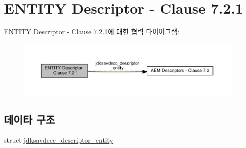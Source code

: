 \hypertarget{group__descriptor__entity}{}\section{E\+N\+T\+I\+TY Descriptor -\/ Clause 7.2.1}
\label{group__descriptor__entity}
E\+N\+T\+I\+TY Descriptor -\/ Clause 7.2.1에 대한 협력 다이어그램\+:
\nopagebreak
\begin{figure}[H]
\begin{center}
\leavevmode
\includegraphics[width=350pt]{group__descriptor__entity}
\end{center}
\end{figure}
\subsection*{데이타 구조}
\begin{DoxyCompactItemize}
\item 
struct \hyperlink{structjdksavdecc__descriptor__entity}{jdksavdecc\+\_\+descriptor\+\_\+entity}
\end{DoxyCompactItemize}
